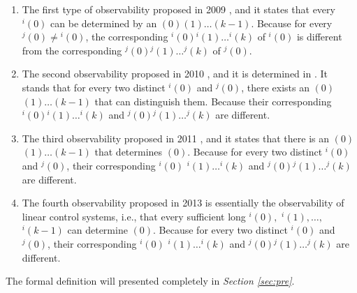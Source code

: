 \begin{enumerate}
	\item The first type of observability proposed in 2009 \cite{cheng2009controllability}, and it states that every \State$^{i}(0)$ can be determined by an \Input$(0)$\Input$(1)\ldots$\Input$(k-1)$. Because for every \State$^{j}(0)\ne$\State$^{i}(0)$, the corresponding \Output$^{i}(0)$\Output$^{i}(1)\ldots$\Output$^{i}(k)$ of \State$^{i}(0)$ is different from the corresponding \Output$^{j}(0)$\Output$^{j}(1)\ldots$\Output$^{j}(k)$ of \State$^{j}(0)$. %
	\item 
	The second observability proposed in 2010 \cite{Zhao2010Input}, and it is determined in \cite{Li2015Controllability}. It stands that for every two distinct \State$^{i}(0)$ and \State$^{j}(0)$, there exists an \Input$(0)$\Input$(1)\ldots$\Input$(k-1)$ that can distinguish them. Because their corresponding \Output$^{i}(0)$\Output$^{i}(1)\ldots$\Output$^{i}(k)$ and \Output$^{j}(0)$\Output$^{j}(1)\ldots$\Output$^{j}(k)$ are different. %
	\item The third observability proposed in 2011 \cite{Cheng2011Identification}, and it states that there is an \Input$(0)$\Input$(1)\ldots$\Input$(k-1)$ that determines \State$(0)$. Because for every two distinct \State$^{i}(0)$ and \State$^{j}(0)$, their corresponding \Output$^{i}(0)$ \Output$^{i}(1)\ldots$\Output$^{i}(k)$ and \Output$^{j}(0)$\Output$^{j}(1)\ldots$\Output$^{j}(k)$ are different.
	
	\item  The fourth observability proposed in 2013 \cite{Fornasini2013Observability} is essentially the observability of linear control systems, i.e., that every sufficient long \Input$^{i}(0),$ \Input$^{i}(1),\ldots,$ \Input$^{i}(k-1)$ can determine \State$(0)$. Because for every two distinct \State$^{i}(0)$ and \State$^{j}(0)$, their corresponding \Output$^{i}(0)$ \Output$^{i}(1)\ldots$\Output$^{i}(k)$ and \Output$^{j}(0)$\Output$^{j}(1)\ldots$\Output$^{j}(k)$ are different. %
\end{enumerate}
 The formal definition will presented completely in {\em Section \ref{sec:pre}}.

